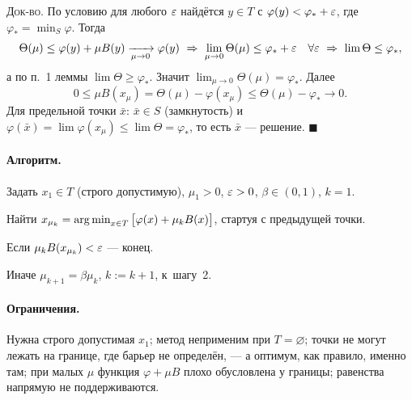 \textsc{Док-во.} По условию для любого $\varepsilon$ найдётся $y \in T$ с
$\varphi(y) < \varphi_* + \varepsilon$, где $\varphi_* = \min_S\varphi$. Тогда
\[
  \Theta(\mu) \le \varphi(y) + \mu B(y) \xrightarrow[\mu\to0]{} \varphi(y)
  \ \Rightarrow\ \lim_{\mu\to0}\Theta(\mu) \le \varphi_* + \varepsilon
  \quad \forall\varepsilon
  \ \Rightarrow\ \lim\Theta \le \varphi_* ,
\]
а по п.~1 леммы $\lim\Theta \ge \varphi_*$. Значит
$\lim_{\mu\to0}\Theta(\mu) = \varphi_*$. Далее
\[
  0 \le \mu B(x_\mu) = \Theta(\mu) - \varphi(x_\mu)
    \le \Theta(\mu) - \varphi_* \to 0 .
\]
Для предельной точки $\bar{x}$: $\bar{x} \in S$ (замкнутость) и
$\varphi(\bar{x}) = \lim\varphi(x_\mu) \le \lim\Theta = \varphi_*$, то есть
$\bar{x}$ — решение. $\blacksquare$

\paragraph{Алгоритм.}
\begin{csteps}
  \item Задать $x_1 \in T$ (строго допустимую), $\mu_1 > 0$, $\varepsilon > 0$,
        $\beta \in (0,1)$, $k = 1$.
  \item Найти $x_{\mu_k} = \operatorname*{arg\,min}_{x\in T}\big[\varphi(x) + \mu_k B(x)\big]$,
        стартуя с предыдущей точки.
  \item Если $\mu_k B(x_{\mu_k}) < \varepsilon$ — конец.
  \item Иначе $\mu_{k+1} = \beta\mu_k$, $k := k+1$, к~шагу~2.
\end{csteps}

\paragraph{Ограничения.}
Нужна строго допустимая $x_1$; метод неприменим при $T = \varnothing$; точки
не могут лежать на границе, где барьер не определён, — а оптимум, как правило,
именно там; при малых $\mu$ функция $\varphi + \mu B$ плохо обусловлена у
границы; равенства напрямую не поддерживаются.

